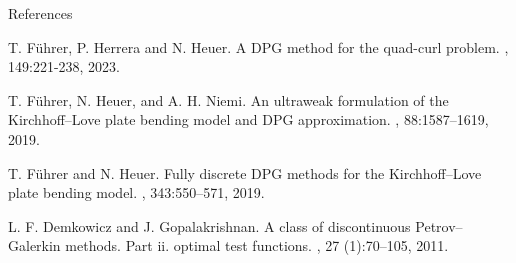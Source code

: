 \documentclass[10pt, compress]{beamer}
\begin{document}
\begin{frame}{References}
\begin{thebibliography}{99}
 T. Führer, P. Herrera and N. Heuer.
\newblock A DPG method for the quad-curl problem.
, 149:221-238, 2023.

T. F\"uhrer, N. Heuer, and A. H. Niemi. 
\newblock An ultraweak formulation of the Kirchhoff–Love plate bending model
and DPG approximation. 
, 88:1587--1619, 2019.

 T. F\"uhrer and N. Heuer. 
\newblock Fully discrete DPG methods for the Kirchhoff–Love plate bending model. 
, 343:550--571, 2019.


 L. F. Demkowicz and J. Gopalakrishnan. 
\newblock A class of discontinuous Petrov–Galerkin methods. Part ii. optimal test functions.
, 27 (1):70--105, 2011. 
 \end{thebibliography}
\end{frame}
\end{document}
